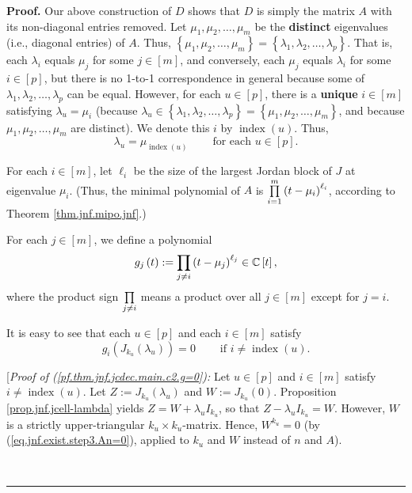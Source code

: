 \documentclass[numbers=enddot,12pt,final,onecolumn,notitlepage]{scrartcl}%
\numberwithin{exer}{subsection}
\theoremstyle{definition}
\newenvironment{proof}[1][Proof]{\noindent\textbf{#1.} }{\ \rule{0.5em}{0.5em}}
\let\prodnonlimits\prod
\renewcommand{\prod}{\prodnonlimits\limits}
\newenvironment{noncompile}{}{}
\begin{document}
\begin{proof}
\begin{noncompile}
Our above construction of $D$ shows that $D$ is simply the matrix $A$ with its
non-diagonal entries removed. Let $\mu_{1},\mu_{2},\ldots,\mu_{m}$ be the
\textbf{distinct} eigenvalues (i.e., diagonal entries) of $A$. Thus, $\left\{
\mu_{1},\mu_{2},\ldots,\mu_{m}\right\}  =\left\{  \lambda_{1},\lambda
_{2},\ldots,\lambda_{p}\right\}  $. That is, each $\lambda_{i}$ equals
$\mu_{j}$ for some $j\in\left[  m\right]  $, and conversely, each $\mu_{j}$
equals $\lambda_{i}$ for some $i\in\left[  p\right]  $, but there is no 1-to-1
correspondence in general because some of $\lambda_{1},\lambda_{2}%
,\ldots,\lambda_{p}$ can be equal. However, for each $u\in\left[  p\right]  $,
there is a \textbf{unique} $i\in\left[  m\right]  $ satisfying $\lambda
_{u}=\mu_{i}$ (because $\lambda_{u}\in\left\{  \lambda_{1},\lambda_{2}%
,\ldots,\lambda_{p}\right\}  =\left\{  \mu_{1},\mu_{2},\ldots,\mu_{m}\right\}
$, and because $\mu_{1},\mu_{2},\ldots,\mu_{m}$ are distinct). We denote this
$i$ by $\operatorname*{index}\left(  u\right)  $. Thus,
\begin{equation}
\lambda_{u}=\mu_{\operatorname*{index}\left(  u\right)  }%
\ \ \ \ \ \ \ \ \ \ \text{for each }u\in\left[  p\right]  .
\label{pf.thm.jnf.jcdec.main.c2.index}%
\end{equation}


For each $i\in\left[  m\right]  $, let $\ell_{i}$ be the size of the largest
Jordan block of $J$ at eigenvalue $\mu_{i}$. (Thus, the minimal polynomial of
$A$ is $\prod\limits_{i=1}^{m}\left(  t-\mu_{i}\right)  ^{\ell_{i}}$,
according to Theorem \ref{thm.jnf.mipo.jnf}.)

For each $j\in\left[  m\right]  $, we define a polynomial%
\begin{equation}
g_{j}\left(  t\right)  :=\prod\limits_{j\neq i}\left(  t-\mu_{j}\right)
^{\ell_{j}}\in\mathbb{C}\left[  t\right]  ,
\label{pf.thm.jnf.jcdec.main.c2.g-def}%
\end{equation}
where the product sign $\prod\limits_{j\neq i}$ means a product over all
$j\in\left[  m\right]  $ except for $j=i$.

It is easy to see that each $u\in\left[  p\right]  $ and each $i\in\left[
m\right]  $ satisfy%
\begin{equation}
g_{i}\left(  J_{k_{u}}\left(  \lambda_{u}\right)  \right)
=0\ \ \ \ \ \ \ \ \ \ \text{if }i\neq\operatorname*{index}\left(  u\right)  .
\label{pf.thm.jnf.jcdec.main.c2.g=0}%
\end{equation}


[\textit{Proof of (\ref{pf.thm.jnf.jcdec.main.c2.g=0}):} Let $u\in\left[
p\right]  $ and $i\in\left[  m\right]  $ satisfy $i\neq\operatorname*{index}%
\left(  u\right)  $. Let $Z:=J_{k_{u}}\left(  \lambda_{u}\right)  $ and
$W:=J_{k_{u}}\left(  0\right)  $. Proposition \ref{prop.jnf.jcell-lambda}
yields $Z=W+\lambda_{u}I_{k_{u}}$, so that $Z-\lambda_{u}I_{k_{u}}=W$.
However, $W$ is a strictly upper-triangular $k_{u}\times k_{u}$-matrix. Hence,
$W^{k_{u}}=0$ (by (\ref{eq.jnf.exist.step3.An=0}), applied to $k_{u}$ and $W$
instead of $n$ and $A$).


\end{noncompile}
\end{proof}
\end{document}
